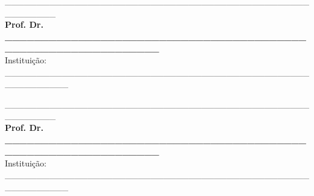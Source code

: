 \documentclass[
	12pt,				%
	oneside,			%
	a4paper,			%
	english,			%
	brazil				%
]{abntex2}
\begin{document}
\begin{folhadeaprovacao}
\begin{center}
		\_\_\_\_\_\_\_\_\_\_\_\_\_\_\_\_\_\_\_\_\_\_\_\_\_\_\_\_\_\_\_\_\_\_\_\_\_\_\_\_\_\_\_\_\_\_\_\_\_\_\_\_\_\_\_\_
		\vspace*{0.2cm} 
		\\ \textbf{Prof. Dr. \_\_\_\_\_\_\_\_\_\_\_\_\_\_\_\_\_\_\_\_\_\_\_\_\_\_\_\_\_\_\_\_\_\_\_\_\_\_\_\_\_\_\_\_\_\_\_\_\_\_\_\_\_\_\_\_\_\_\_\_\_\_} 
		\\ \vspace*{0.2cm} 
		Instituição: \_\_\_\_\_\_\_\_\_\_\_\_\_\_\_\_\_\_\_\_\_\_\_\_\_\_\_\_\_\_\_\_\_\_\_\_\_\_\_\_\_\_\_\_\_\_\_\_\_\_\_\_\_\_\_\_\_\_

		\vspace*{2cm}

		\_\_\_\_\_\_\_\_\_\_\_\_\_\_\_\_\_\_\_\_\_\_\_\_\_\_\_\_\_\_\_\_\_\_\_\_\_\_\_\_\_\_\_\_\_\_\_\_\_\_\_\_\_\_\_\_
		\vspace*{0.2cm} 
		\\ \textbf{Prof. Dr. \_\_\_\_\_\_\_\_\_\_\_\_\_\_\_\_\_\_\_\_\_\_\_\_\_\_\_\_\_\_\_\_\_\_\_\_\_\_\_\_\_\_\_\_\_\_\_\_\_\_\_\_\_\_\_\_\_\_\_\_\_\_} 
		\\ \vspace*{0.2cm} 
		Instituição: \_\_\_\_\_\_\_\_\_\_\_\_\_\_\_\_\_\_\_\_\_\_\_\_\_\_\_\_\_\_\_\_\_\_\_\_\_\_\_\_\_\_\_\_\_\_\_\_\_\_\_\_\_\_\_\_\_\_
	\end{center}
  
\end{folhadeaprovacao}
\end{document}
